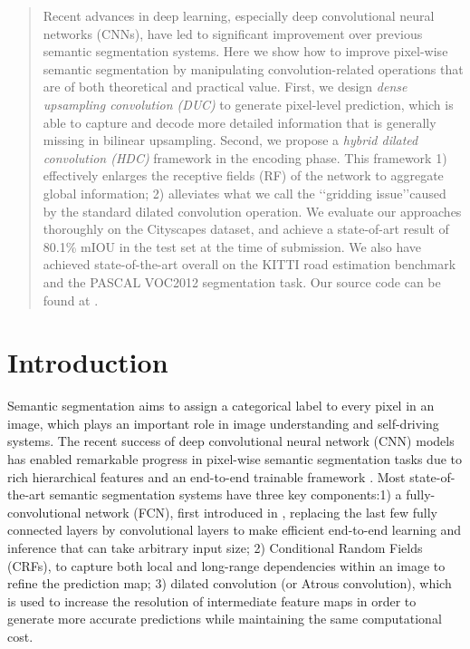 \documentclass[10pt,twocolumn,letterpaper]{article}
\begin{document}
\begin{abstract}
Recent advances in deep learning, especially deep convolutional neural networks (CNNs), have led to significant improvement over previous semantic segmentation systems. Here we show how to improve pixel-wise semantic segmentation by manipulating convolution-related operations that are of both theoretical and practical value. First, we design \textit{dense upsampling convolution (DUC)} to generate pixel-level prediction, which is able to capture and decode more detailed information that is generally missing in bilinear upsampling. Second, we propose a \textit{hybrid dilated convolution (HDC)} framework in the encoding phase. This framework 1) effectively enlarges the receptive fields (RF) of the network to aggregate global information; 2) alleviates what we call the \lq\lq gridding issue\rq\rq caused by the standard dilated convolution operation. We evaluate our approaches thoroughly on the Cityscapes dataset, and achieve a state-of-art result of 80.1\% mIOU in the test set at the time of submission. We also have achieved state-of-the-art overall on the KITTI road estimation benchmark and the PASCAL VOC2012 segmentation task. Our source code can be found at \href{https://github.com/TuSimple/TuSimple-DUC}{} .
\end{abstract}

\section{Introduction}

Semantic segmentation aims to assign a categorical label to every pixel in an image, which plays an important role in image understanding and self-driving systems. The recent success of deep convolutional neural network (CNN) models \cite{krizhevsky2012imagenet,simonyan2014very,he2015deep} has enabled remarkable progress in pixel-wise semantic segmentation tasks due to rich hierarchical features and an end-to-end trainable framework \cite{long2015fully,zheng2015conditional,yu2015multi,liu2015semantic,lin2015efficient,chen2016deeplab}. Most state-of-the-art semantic segmentation systems have three key components:1) a fully-convolutional network (FCN), first introduced in \cite{long2015fully}, replacing the last few fully connected layers by convolutional layers to make efficient end-to-end learning and inference that can take arbitrary input size; 2) Conditional Random Fields (CRFs), to capture both local and long-range dependencies within an image to refine the prediction map; 3) dilated convolution (or Atrous convolution), which is used to increase the resolution of intermediate feature maps in order to generate more accurate predictions while maintaining the same computational cost. 
\end{document}
